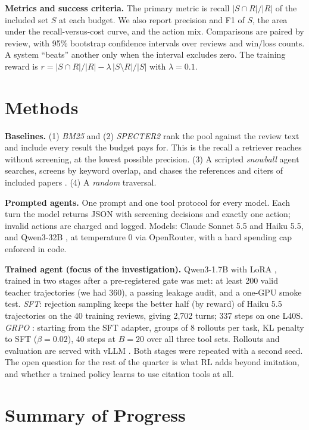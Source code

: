 \documentclass{article} %
\begin{document}
\textbf{Metrics and success criteria.} The primary metric is recall $|S\cap R|/|R|$ of the
included set $S$ at each budget. We also report precision and F1 of $S$, the area under the
recall-versus-cost curve, and the action mix. Comparisons are paired by review, with 95\%
bootstrap confidence intervals over reviews and win/loss counts. A system ``beats'' another only
when the interval excludes zero. The training reward is
$r = |S\cap R|/|R| - \lambda\,|S\setminus R|/|S|$ with $\lambda = 0.1$.

\section{Methods}

\textbf{Baselines.} (1) \emph{BM25} and (2) \emph{SPECTER2} \citep{singh2023scirepeval} rank the
pool against the review text and include every result the budget pays for. This is the recall a
retriever reaches without screening, at the lowest possible precision. (3) A scripted
\emph{snowball} agent searches, screens by keyword overlap, and chases the references and citers
of included papers \citep{wohlin2014snowballing}. (4) A \emph{random} traversal.

\textbf{Prompted agents.} One prompt and one tool protocol for every model. Each turn the model
returns JSON with screening decisions and exactly one action; invalid actions are charged and
logged. Models: Claude Sonnet 5.5 and Haiku 5.5, and Qwen3-32B \citep{yang2025qwen3}, at
temperature 0 via OpenRouter, with a hard spending cap enforced in code.

\textbf{Trained agent (focus of the investigation).} Qwen3-1.7B with LoRA
\citep{hu2022lora}, trained in two stages after a pre-registered gate was met: at least 200
valid teacher trajectories (we had 360), a passing leakage audit, and a one-GPU smoke test.
\emph{SFT}: rejection sampling keeps the better half (by reward) of Haiku 5.5 trajectories on the
40 training reviews, giving 2{,}702 turns; 337 steps on one L40S.
\emph{GRPO} \citep{shao2024deepseekmath}: starting from the SFT adapter, groups of 8 rollouts
per task, KL penalty to SFT ($\beta=0.02$), 40 steps at $B=20$ over all three tool sets.
Rollouts and evaluation are served with vLLM \citep{kwon2023vllm}. Both stages were repeated
with a second seed. The open question for the rest of the quarter is what RL adds beyond
imitation, and whether a trained policy learns to use citation tools at all.

\section{Summary of Progress}
\end{document}
